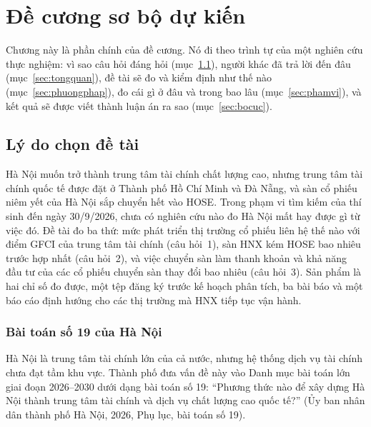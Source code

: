\chapter{Đề cương sơ bộ dự kiến}\label{ch:4}

Chương này là phần chính của đề cương. Nó đi theo trình tự của một nghiên cứu thực nghiệm: vì sao câu hỏi đáng hỏi (mục~\ref{sec:lydo}), người khác đã trả lời đến đâu (mục~\ref{sec:tongquan}), đề tài sẽ đo và kiểm định như thế nào (mục~\ref{sec:phuongphap}), đo cái gì ở đâu và trong bao lâu (mục~\ref{sec:phamvi}), và kết quả sẽ được viết thành luận án ra sao (mục~\ref{sec:bocuc}).

\section{Lý do chọn đề tài}\label{sec:lydo}

\begin{tomtat}
Hà Nội muốn trở thành trung tâm tài chính chất lượng cao, nhưng trung tâm tài chính quốc tế được đặt ở Thành phố Hồ Chí Minh và Đà Nẵng, và sàn cổ phiếu niêm yết của Hà Nội sắp chuyển hết vào HOSE. Trong phạm vi tìm kiếm của thí sinh đến ngày 30/9/2026, chưa có nghiên cứu nào đo Hà Nội mất hay được gì từ việc đó. Đề tài đo ba thứ: mức phát triển thị trường cổ phiếu liên hệ thế nào với điểm GFCI của trung tâm tài chính (câu hỏi~1), sàn HNX kém HOSE bao nhiêu trước hợp nhất (câu hỏi~2), và việc chuyển sàn làm thanh khoản và khả năng đầu tư của các cổ phiếu chuyển sàn thay đổi bao nhiêu (câu hỏi~3). Sản phẩm là hai chỉ số đo được, một tệp đăng ký trước kế hoạch phân tích, ba bài báo và một báo cáo định hướng cho các thị trường mà HNX tiếp tục vận hành.
\end{tomtat}

\subsection*{Bài toán số 19 của Hà Nội}

Hà Nội là trung tâm tài chính lớn của cả nước, nhưng hệ thống dịch vụ tài chính chưa đạt tầm khu vực. Thành phố đưa vấn đề này vào Danh mục bài toán lớn giai đoạn 2026--2030 dưới dạng bài toán số 19: \enquote{Phương thức nào để xây dựng Hà Nội thành trung tâm tài chính và dịch vụ chất lượng cao quốc tế?} (Ủy ban nhân dân thành phố Hà Nội, 2026, Phụ lục, bài toán số 19).

